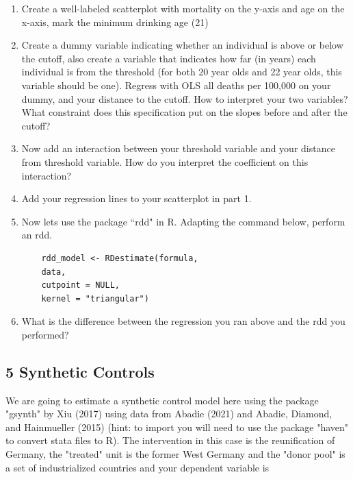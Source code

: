 \documentclass[11pt]{article}
\begin{document}
\begin{enumerate}[label=\alph*)]
    \item Create a well-labeled scatterplot with mortality on the y-axis and age on the x-axis, mark the minimum drinking age (21)
    \item Create a dummy variable indicating whether an individual is above or below the cutoff, also create a variable that indicates how far (in years) each individual is from the threshold (for both 20 year olds and 22 year olds, this variable should be one). Regress with OLS all deaths per 100,000 on  your  dummy, and your distance to the cutoff. How to interpret your two variables? What constraint does this specification put on the slopes before and after the cutoff?
    \item Now add an interaction between your threshold variable and your distance from threshold variable. How do you interpret the coefficient on this interaction?
    \item Add your regression lines to your scatterplot in part 1.
    \item Now lets use the package ``rdd" in R. Adapting the command below, perform an rdd.
    \begin{verbatim}
    rdd_model <- RDestimate(formula,
    data, 
    cutpoint = NULL,
    kernel = "triangular")
    \end{verbatim}
    \item What is the difference between the regression you ran above and the rdd you performed? 
\end{enumerate}




\subsection*{5 Synthetic Controls}
We are going to estimate a synthetic control model here using the package "gsynth" by Xiu (2017) using data from  Abadie (2021) and Abadie, Diamond, and Hainmueller (2015) (hint: to import you will need to use the package "haven" to convert stata files to R). The intervention in this case is the reunification of Germany, the "treated" unit is the former West Germany and the "donor pool" is a set of industrialized countries and your dependent variable is 
\end{document}
